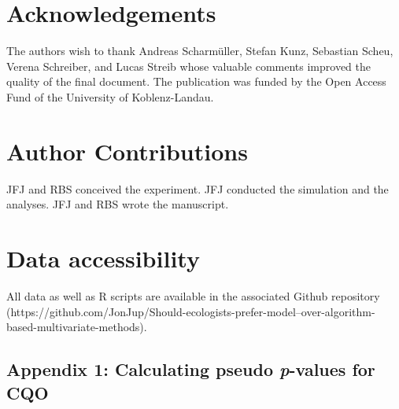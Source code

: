 \documentclass[a4paper,11pt]{article}
\begin{document}
\section*{Acknowledgements}
The authors wish to thank Andreas Scharmüller, Stefan Kunz, Sebastian Scheu, Verena Schreiber, and Lucas Streib whose valuable comments  improved the quality of the final document. The publication was funded by the Open Access Fund of the University of Koblenz-Landau.
\section*{Author Contributions}
JFJ and RBS conceived the experiment. JFJ conducted the simulation and the analyses. JFJ and RBS wrote the manuscript.
\section*{Data accessibility}
All data as well as R scripts are available in the associated Github repository (https://github.com/JonJup/Should-ecologists-prefer-model--over-algorithm-based-multivariate-methods). 


\newpage
\setcounter{figure}{0}
\setcounter{table}{0}

\subsection*{Appendix 1: Calculating pseudo \textit{p}-values for CQO}
 
\end{document}
